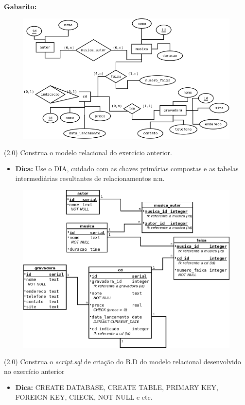 \documentclass[12pt]{exam}
\begin{document}
\begin{questions}
\textbf{Gabarito:}
\begin{figure}[!htp]
\centering
\includegraphics[width=0.7\linewidth]{figuras/prova-er.png}
\end{figure}

\newpage

\question (2.0) Construa o modelo relacional do exercício anterior.

\begin{itemize}
    \item \textbf{Dica:} Use o DIA, cuidado com as chaves primárias compostas e as tabelas intermediárias resultantes de relacionamentos n:n.
\end{itemize}

\begin{figure}[!htp]
\centering
\includegraphics[width=1\linewidth]{figuras/prova-modelo-relacional.png}
\end{figure}

\question (2.0) Construa o \textit{script.sql} de criação do B.D do modelo relacional desenvolvido no exercício anterior 
\begin{itemize}
    \item \textbf{Dica:} CREATE DATABASE, CREATE TABLE, PRIMARY KEY, FOREIGN KEY, CHECK, NOT NULL e etc.
\end{itemize}


\end{questions}
\end{document}

